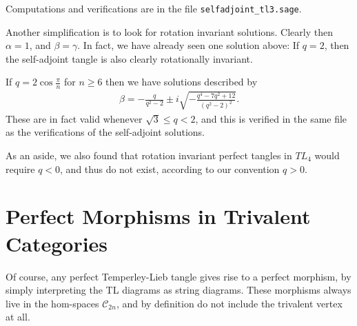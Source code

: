Computations and verifications are in the file \texttt{selfadjoint\_tl3.sage}.

\bigno
Another simplification is to look for rotation invariant solutions. Clearly then $\alpha = 1$, and $\beta = \gamma$. In fact, we have already seen one solution above: If $q=2$, then the self-adjoint tangle is also clearly rotationally invariant.

If $q=2\cos\frac{\pi}{n}$ for $n\geq 6$ then we have solutions described by
\begin{align*}
\beta = 
-\frac{q}{q^2-2}
\pm i
\sqrt{-\frac{q^4-7 q^2+12}{\left(q^2-2\right)^2}}.
\end{align*}
These are in fact valid whenever $\sqrt{3}\leq q < 2$, and this is verified in the same file as the verifications of the self-adjoint solutions.

\begin{remark}
As an aside, we also found that rotation invariant perfect tangles in $TL_4$ would require $q<0$, and thus do not exist, according to our convention $q>0$.
\end{remark}

\section{Perfect Morphisms in Trivalent Categories}
Of course, any perfect Temperley-Lieb tangle gives rise to a perfect morphism, by simply interpreting the TL diagrams as string diagrams. These morphisms always live in the hom-spaces $\mathcal{C}_{2n}$, and by definition do not include the trivalent vertex at all. 

